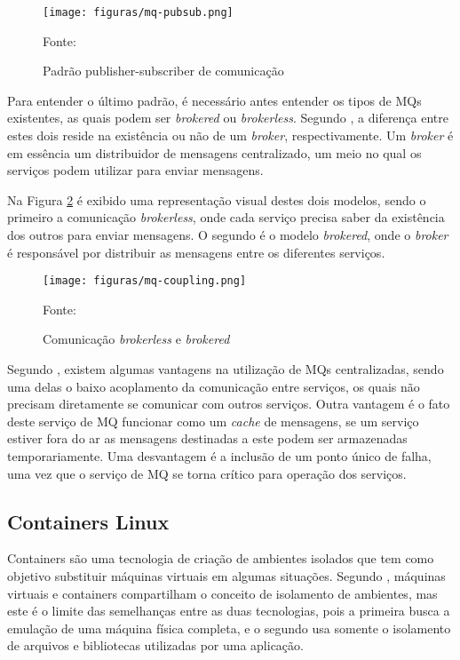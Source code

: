 \begin{figure}[H]
	\centering
	\caption{Padrão publisher-subscriber de comunicação}
	\texttt{[image: figuras/mq-pubsub.png]}

	\label{fig:mq-pubsub}
	\footnotesize Fonte: 
\end{figure}

Para entender o último padrão, é necessário antes entender os tipos de \acp{MQ}
existentes, as quais podem ser \emph{brokered} ou \emph{brokerless}. Segundo
, a diferença entre estes dois reside na existência
ou não de um \emph{broker}, respectivamente. Um \emph{broker} é em essência um
distribuidor de mensagens centralizado, um meio no qual os serviços podem
utilizar para enviar mensagens.

Na Figura \ref{fig:mq-coupling} é exibido uma representação visual destes dois
modelos, sendo o primeiro a comunicação \emph{brokerless}, onde cada serviço
precisa saber da existência dos outros para enviar mensagens. O segundo é
o modelo \emph{brokered}, onde o \emph{broker} é responsável por distribuir
as mensagens entre os diferentes serviços.

\begin{figure}[H]
	\centering
	\caption{Comunicação \emph{brokerless} e \emph{brokered}}
	\texttt{[image: figuras/mq-coupling.png]}

	\label{fig:mq-coupling}
	\footnotesize Fonte: 
\end{figure}

Segundo , existem algumas vantagens na utilização
de \acp{MQ} centralizadas, sendo uma delas o baixo acoplamento da comunicação
entre serviços, os quais não precisam diretamente se comunicar com outros
serviços. Outra vantagem é o fato deste serviço de \ac{MQ} funcionar como
um \emph{cache} de mensagens, se um serviço estiver fora do ar as
mensagens destinadas a este podem ser armazenadas temporariamente. Uma
desvantagem é a inclusão de um ponto único de falha, uma vez que o serviço
de \ac{MQ} se torna crítico para operação dos serviços.

\subsection{Containers Linux}

Containers são uma tecnologia de criação de ambientes isolados que tem
como objetivo substituir máquinas virtuais em algumas situações. Segundo
, máquinas virtuais e containers compartilham o
conceito de isolamento de ambientes, mas este é o limite das semelhanças
entre as duas tecnologias, pois a primeira busca a emulação de uma máquina
física completa, e o segundo usa somente o isolamento de arquivos e
bibliotecas utilizadas por uma aplicação.

